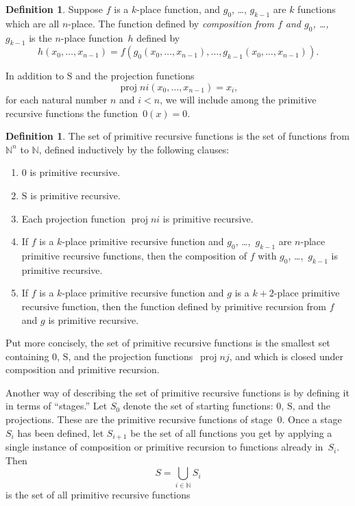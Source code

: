 \documentclass[10pt,a4paper]{article}
\theoremstyle{plain}
\theoremstyle{definition}
\newtheorem{defn}[thm]{Definition}
\theoremstyle{remark}
\newenvironment{explain}{}{}
\newcommand*{\ollabel}[1]{\label{#1}}
\providecommand{\Nat}{\ensuremath{\mathbb{N}}}
\providecommand{\Zero}{\ensuremath{0}}
\providecommand{\Succ}{\ensuremath{\mathrm{S}}}
\providecommand{\Proj}{\operatorname{proj}}
\begin{document}
\begin{defn}
  \ollabel{defn:composition} Suppose $f$ is a $k$-place function, and
  $g_0$, \dots, $g_{k-1}$ are $k$ functions which are all
  $n$-place. The function defined by \emph{composition from $f$ and
    $g_0$, \dots,~$g_{k-1}$} is the $n$-place function~$h$ defined by
  \[
  h(x_0, \dots, x_{n-1}) =
  f(g_0(x_0, \dots, x_{n-1}), \dots, g_{k-1}(x_0, \dots, x_{n-1})).
  \]
\end{defn}

In addition to $\Succ$ and the projection functions
\[
\Proj{n}{i}(x_0,\dots,x_{n-1}) = x_i,
\]
for each natural number $n$ and $i < n$, we will include among the
primitive recursive functions the function~$\Zero(x) = 0$.

\begin{defn}
  The set of primitive recursive functions is the set of functions 
  from $\Nat^n$ to $\Nat$, defined inductively by the
  following clauses:
  \begin{enumerate}
  \item $\Zero$ is primitive recursive.
  \item $\Succ$ is primitive recursive.
  \item Each projection function $\Proj{n}{i}$ is primitive recursive.
  \item If $f$ is a $k$-place primitive recursive function and $g_0$,
    \dots,~$g_{k-1}$ are $n$-place primitive recursive functions, then
    the composition of $f$ with $g_0$, \dots,~$g_{k-1}$ is primitive
    recursive.
  \item If $f$ is a $k$-place primitive recursive function and $g$ is
    a $k+2$-place primitive recursive function, then the function
    defined by primitive recursion from $f$ and $g$ is primitive
    recursive.
\end{enumerate}
\end{defn}

\begin{explain}
Put more concisely, the set of primitive recursive functions is the
smallest set containing $\Zero$, $\Succ$, and the projection
functions~$\Proj{n}{j}$, and which is closed under composition and
primitive recursion.

Another way of describing the set of primitive recursive functions is
by defining it in terms of ``stages.'' Let $S_0$ denote the set of
starting functions: $\Zero$, $\Succ$, and the projections. These are
the primitive recursive functions of stage~$0$. Once a stage $S_i$ has
been defined, let $S_{i+1}$ be the set of all functions you get by
applying a single instance of composition or primitive recursion to
functions already in~$S_i$. Then
\[
S = \bigcup_{i \in \Nat} S_i
\]
is the set of all primitive recursive functions
\end{explain}
\end{document}
